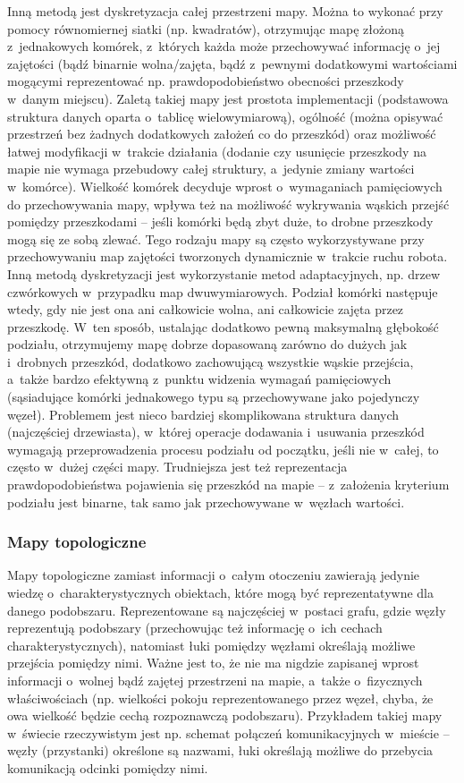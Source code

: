 Inną metodą jest dyskretyzacja całej przestrzeni mapy. Można to wykonać przy pomocy
równomiernej siatki (np. kwadratów), otrzymując mapę złożoną z~jednakowych komórek,
z~których każda może przechowywać informację o~jej zajętości (bądź binarnie wolna/zajęta,
bądź z~pewnymi dodatkowymi wartościami mogącymi reprezentować np. prawdopodobieństwo
obecności przeszkody w~danym miejscu). Zaletą takiej mapy jest prostota implementacji
(podstawowa struktura danych oparta o~tablicę wielowymiarową), ogólność (można opisywać
przestrzeń bez żadnych dodatkowych założeń co do przeszkód) oraz możliwość łatwej modyfikacji
w~trakcie działania (dodanie czy usunięcie przeszkody na mapie nie wymaga przebudowy
całej struktury, a~jedynie zmiany wartości w~komórce). Wielkość komórek decyduje wprost
o~wymaganiach pamięciowych do przechowywania mapy, wpływa też na możliwość
wykrywania wąskich przejść pomiędzy przeszkodami -- jeśli komórki będą zbyt duże, to
drobne przeszkody mogą się ze sobą zlewać. Tego rodzaju mapy są często wykorzystywane
przy przechowywaniu map zajętości tworzonych dynamicznie w~trakcie ruchu robota.
Inną metodą dyskretyzacji jest wykorzystanie metod adaptacyjnych, np. drzew czwórkowych
w~przypadku map dwuwymiarowych. Podział komórki następuje wtedy, gdy nie jest ona
ani całkowicie wolna, ani całkowicie zajęta przez przeszkodę. W~ten sposób, ustalając
dodatkowo pewną maksymalną głębokość podziału, otrzymujemy mapę dobrze dopasowaną
zarówno do dużych jak i~drobnych przeszkód, dodatkowo zachowującą wszystkie wąskie
przejścia, a~także bardzo efektywną z~punktu widzenia wymagań pamięciowych (sąsiadujące
komórki jednakowego typu są przechowywane jako pojedynczy węzeł). Problemem jest
nieco bardziej skomplikowana struktura danych (najczęściej drzewiasta), w~której
operacje dodawania i~usuwania przeszkód wymagają przeprowadzenia procesu podziału
od początku, jeśli nie w~całej, to często w~dużej części mapy. Trudniejsza jest też
reprezentacja prawdopodobieństwa pojawienia się przeszkód na mapie -- z~założenia kryterium
podziału jest binarne, tak samo jak przechowywane w~węzłach wartości.

\subsubsection{Mapy topologiczne}

Mapy topologiczne zamiast informacji o~całym otoczeniu zawierają jedynie wiedzę
o~charakterystycznych obiektach, które mogą być reprezentatywne dla danego podobszaru.
Reprezentowane są najczęściej w~postaci grafu, gdzie węzły reprezentują podobszary
(przechowując też informację o~ich cechach charakterystycznych), natomiast łuki
pomiędzy węzłami określają możliwe przejścia pomiędzy nimi. Ważne jest to, że nie
ma nigdzie zapisanej wprost informacji o~wolnej bądź zajętej przestrzeni na mapie,
a~także o~fizycznych właściwościach (np. wielkości pokoju reprezentowanego przez węzeł,
chyba, że owa wielkość będzie cechą rozpoznawczą podobszaru). Przykładem takiej mapy
w~świecie rzeczywistym jest np. schemat połączeń komunikacyjnych w~mieście -- węzły (przystanki)
określone są nazwami, łuki określają możliwe do przebycia komunikacją odcinki pomiędzy
nimi.

